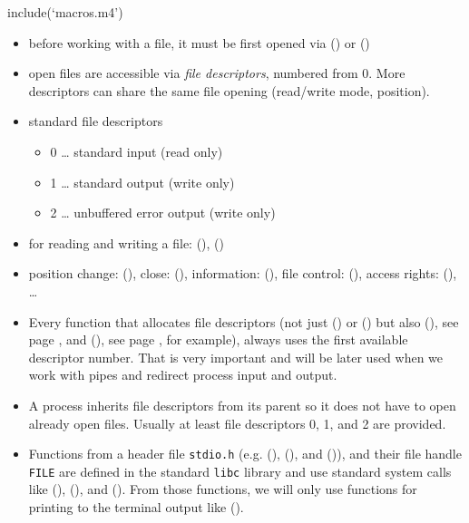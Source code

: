 include(`macros.m4')


\begin{slide}
\begin{itemize}
\item before working with a file, it must be first opened via
() or ()
\item open files are accessible via \emph{file descriptors}, numbered from 0.
More descriptors can share the same file opening (read/write mode, position).
\item standard file descriptors
    \begin{itemize}
    \item 0 \dots{} standard input (read only) 
    \item 1 \dots{} standard output (write only) 
    \item 2 \dots{} unbuffered error output (write only) 
    \end{itemize}
\item for reading and writing a file: (), ()
\item position change: (), close: (),
information: (), file control: (),
access rights: (), \dots
\end{itemize}
\end{slide}

\begin{itemize}
\item Every function that allocates file descriptors (not just () or
() but also (), see page \pageref{PIPEREADWRITE}, and
(), see page \pageref{DUP_CALL}, for example), always uses the first
available descriptor number.  That is very important and will be later used when
we work with pipes and redirect process input and output.
\item A process inherits file descriptors from its parent so it does not have to
open already open files.  Usually at least file descriptors 0, 1, and 2 are
provided.
\item Functions from a header file \texttt{stdio.h} (e.g. (),
(), and ()), and their file handle \texttt{FILE}
are defined in the standard \texttt{libc} library and use standard system calls
like (), (), and ().  From those functions,
we will only use functions for printing to the terminal output like
().
\end{itemize}

